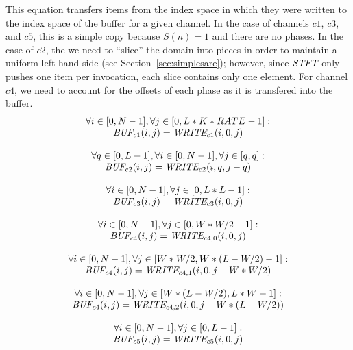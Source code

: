 This equation transfers items from the index space in which they were
written to the index space of the buffer for a given channel.  In the
case of channels $c1$, $c3$, and $c5$, this is a simple copy because
$S(n) = 1$ and there are no phases.  In the case of $c2$, the we need
to ``slice'' the domain into pieces in order to maintain a uniform
left-hand side (see Section~\ref{sec:simplesare}); however, since
$\mbox{\it STFT}$ only pushes one item per invocation, each slice contains
only one element.  For channel $c4$, we need to account for the
offsets of each phase as it is transfered into the buffer.
{\scriptsize
\begin{equation*}
\begin{array}{c}
\forall i \in [0, N-1], \forall j \in [0, L*K*RATE-1]: \\ \mbox{\it BUF}_{c1}(i,j) = \mbox{\it WRITE}_{c1}(i,0,j) \\ ~ \\
\forall q \in [0, L-1], \forall i \in [0,N-1], \forall j \in [q, q]: \\ \mbox{\it BUF}_{c2}(i,j) = \mbox{\it WRITE}_{c2}(i,q,j-q) \\ ~ \\
\forall i \in [0, N-1], \forall j \in [0, L*L-1]: \\ \mbox{\it BUF}_{c3}(i,j) = \mbox{\it WRITE}_{c3}(i,0,j) \\ ~ \\
\forall i \in [0, N-1], \forall j \in [0, W*W/2-1]: \\ \mbox{\it BUF}_{c4}(i,j) = \mbox{\it WRITE}_{c4,0}(i,0,j) \\ ~ \\
\forall i \in [0, N-1], \forall j \in [W*W/2, W*(L-W/2)-1]: \\ \mbox{\it BUF}_{c4}(i,j) = \mbox{\it WRITE}_{c4,1}(i,0,j-W*W/2) \\ ~ \\
\forall i \in [0, N-1], \forall j \in [W*(L-W/2), L*W-1]: \\ \mbox{\it BUF}_{c4}(i,j) = \mbox{\it WRITE}_{c4,2}(i,0,j-W*(L-W/2)) \\ ~ \\
\forall i \in [0, N-1], \forall j \in [0, L-1]: \\ \mbox{\it BUF}_{c5}(i,j) = \mbox{\it WRITE}_{c5}(i,0,j)
\end{array}
\end{equation*}}


